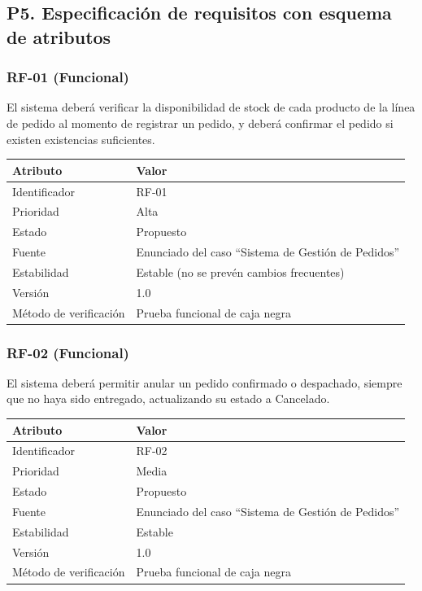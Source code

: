 \documentclass[11pt]{article}
\begin{document}
\subsection*{P5. Especificación de requisitos con esquema de atributos}

\subsubsection*{RF-01 (Funcional)}
El sistema deberá verificar la disponibilidad de stock de cada producto de la línea de pedido al momento
de registrar un pedido, y deberá confirmar el pedido si existen existencias suficientes.

\begin{table}[h]
\centering
\begin{tabular}{ll}
\toprule
\textbf{Atributo} & \textbf{Valor} \\
\midrule
Identificador & RF-01 \\
Prioridad & Alta \\
Estado & Propuesto \\
Fuente & Enunciado del caso ``Sistema de Gestión de Pedidos'' \\
Estabilidad & Estable (no se prevén cambios frecuentes) \\
Versión & 1.0 \\
Método de verificación & Prueba funcional de caja negra \\
\bottomrule
\end{tabular}
\end{table}

\subsubsection*{RF-02 (Funcional)}
El sistema deberá permitir anular un pedido confirmado o despachado, siempre que no haya sido entregado,
actualizando su estado a Cancelado.

\begin{table}[h]
\centering
\begin{tabular}{ll}
\toprule
\textbf{Atributo} & \textbf{Valor} \\
\midrule
Identificador & RF-02 \\
Prioridad & Media \\
Estado & Propuesto \\
Fuente & Enunciado del caso ``Sistema de Gestión de Pedidos'' \\
Estabilidad & Estable \\
Versión & 1.0 \\
Método de verificación & Prueba funcional de caja negra \\
\bottomrule
\end{tabular}
\end{table}
\end{document}
